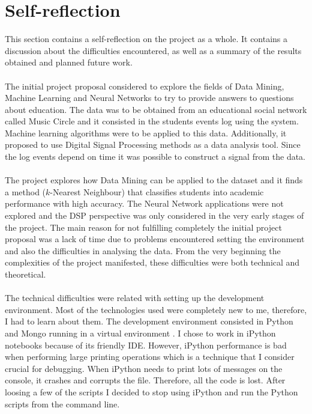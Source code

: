 \documentclass[11pt, oneside]{article}   	%
\begin{document}
\section{Self-reflection}
This section contains a self-reflection on the project as a whole. It contains a discussion about the difficulties encountered, as well as a summary of the results obtained and planned future work.\\\\
The initial project proposal considered to explore the fields of Data Mining, Machine Learning and Neural Networks to try to provide answers to questions about education. The data was to be obtained from an educational social network called Music Circle and it consisted in the students events log using the system. Machine learning algorithms were to be applied to this data. Additionally, it proposed to use Digital Signal Processing methods as a data analysis tool. Since the log events depend on time it was possible to construct a signal from the data.\\\\
The project explores how Data Mining can be applied to the dataset and it finds a method ($k$-Nearest Neighbour) that classifies students into academic performance with high accuracy. The Neural Network applications were not explored and the DSP perspective was only considered in the very early stages of the project. The main reason for not fulfilling completely the initial project proposal was a lack of time due to problems encountered setting the environment and also the difficulties in analysing the data. From the very beginning the complexities of the project manifested, these difficulties were both technical and theoretical.\\\\
The technical difficulties were related with setting up the development environment. Most of the technologies used were completely new to me, therefore, I had to learn about them. The development environment consisted in Python and Mongo running in a virtual environment \cite{VirtualEnv}. I chose to work in iPython notebooks because of its friendly IDE. However, iPython performance is bad when performing large printing operations which is a technique that I consider crucial for debugging. When iPython needs to print lots of messages on the console, it crashes and corrupts the file. Therefore, all the code is lost. After loosing a few of the scripts I decided to stop using iPython and run the Python scripts from the command line.\\ 
\end{document}
